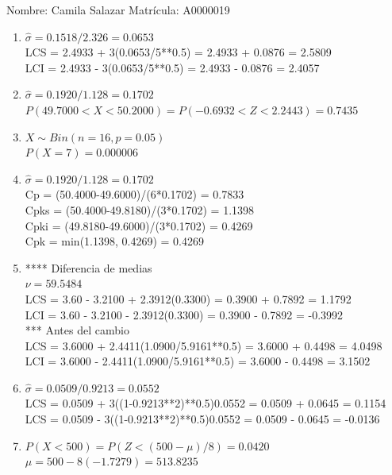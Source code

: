 \documentclass[8pt]{report}
\begin{document}
 \newpage

Nombre: \underline{\hspace*{.2in}}
Camila Salazar
\underline{\hspace*{.2in}} \quad Matr\'icula:\underline{\hspace*{.2in}}
A0000019
\underline{\hspace*{.2in}} \\

\begin{enumerate}
\item $\hat\sigma = 0.1518/2.326 = 0.0653$\\
LCS = 2.4933 + 3(0.0653/5**0.5) = 2.4933 + 0.0876 = 2.5809\\
LCI = 2.4933 - 3(0.0653/5**0.5) = 2.4933 - 0.0876 = 2.4057
\item $\hat\sigma = 0.1920/1.128 = 0.1702$\\
$P(49.7000 < X < 50.2000) = P(-0.6932 < Z < 2.2443) = 0.7435$\\
\item $X \sim Bin(n=16, p=0.05)$\\
$P(X = 7) = 0.000006$
\item $\hat\sigma = 0.1920/1.128 = 0.1702$\\
Cp = (50.4000-49.6000)/(6*0.1702) = 0.7833\\
Cpks = (50.4000-49.8180)/(3*0.1702) = 1.1398\\
Cpki = (49.8180-49.6000)/(3*0.1702) = 0.4269\\
Cpk = min(1.1398, 0.4269) = 0.4269
\item **** Diferencia de medias\\
$\nu = 59.5484$\\
LCS = 3.60 - 3.2100 + 2.3912(0.3300) = 0.3900 + 0.7892 = 1.1792\\
LCI = 3.60 - 3.2100 - 2.3912(0.3300) = 0.3900 - 0.7892 = -0.3992\\
*** Antes del cambio\\
LCS = 3.6000 + 2.4411(1.0900/5.9161**0.5) = 3.6000 + 0.4498 = 4.0498\\
LCI = 3.6000 - 2.4411(1.0900/5.9161**0.5) = 3.6000 - 0.4498 = 3.1502\\
\item $\hat\sigma = 0.0509/0.9213 = 0.0552$\\
LCS = 0.0509 + 3((1-0.9213**2)**0.5)0.0552 = 0.0509 + 0.0645 = 0.1154\\
LCS = 0.0509 - 3((1-0.9213**2)**0.5)0.0552 = 0.0509 - 0.0645 = -0.0136
\item $P(X < 500) = P(Z < (500-\mu)/8) = 0.0420$\\
$\mu = 500 - 8(-1.7279) = 513.8235$\\
\end{enumerate}
\end{document}
